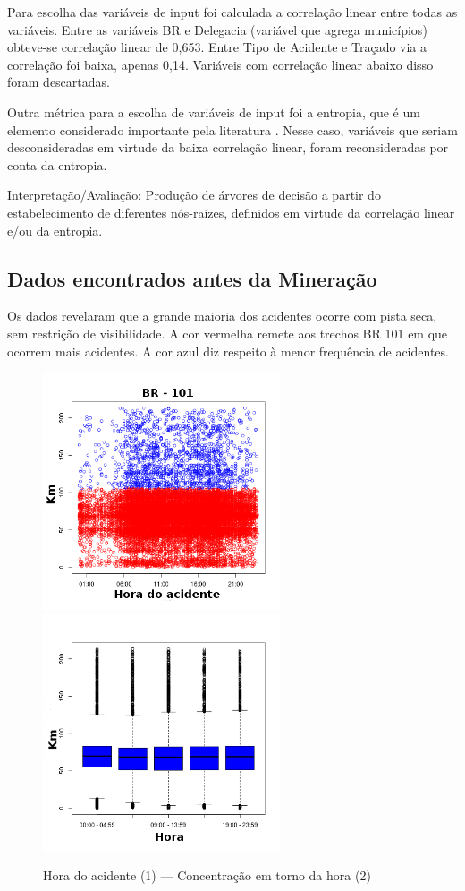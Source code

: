 Para escolha das variáveis de input foi calculada a correlação linear entre todas as variáveis. Entre as variáveis BR e
Delegacia (variável que agrega municípios) obteve-se correlação linear de 0,653. Entre Tipo de Acidente e Traçado via a
correlação foi baixa, apenas 0,14. Variáveis com correlação linear abaixo disso foram descartadas. 

Outra métrica para a escolha de variáveis de input foi a entropia, que é um elemento considerado importante pela literatura \cite{NorvigRussel2004}. Nesse caso, variáveis que seriam desconsideradas em virtude da baixa correlação linear, foram reconsideradas por conta da entropia.

Interpretação/Avaliação: Produção de árvores de decisão a
partir do estabelecimento de diferentes nós-raízes, definidos em
virtude da correlação linear e/ou da entropia.

\pagebreak

\subsection{Dados encontrados antes da Mineração}

Os dados revelaram que a grande maioria dos acidentes ocorre com pista seca, sem restrição de visibilidade. 
A cor vermelha remete aos trechos BR 101 em que ocorrem mais acidentes. A cor azul diz respeito à menor frequência de acidentes.

\begin{figure}[h]
	\caption{Hora do acidente (1) --- Concentração em torno da hora (2) }
	\includegraphics[width=7cm,height=7cm]{Figuras/Preprocess/br101.png}
	\includegraphics[width=7cm,height=7cm]{Figuras/Preprocess/br101_2.png}
	
\end{figure}

